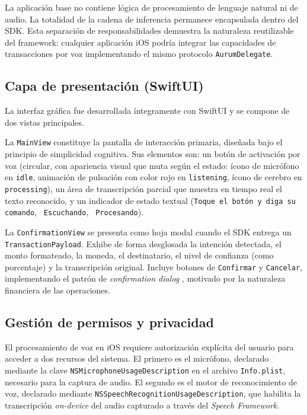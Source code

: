 La aplicación base no contiene lógica de procesamiento de lenguaje natural ni de audio. La totalidad de la cadena de inferencia permanece encapsulada dentro del SDK. Esta separación de responsabilidades demuestra la naturaleza reutilizable del framework: cualquier aplicación iOS podría integrar las capacidades de transacciones por voz implementando el mismo protocolo \texttt{Aurum\allowbreak{}Delegate}.

\subsection{Capa de presentación (SwiftUI)}

La interfaz gráfica fue desarrollada íntegramente con SwiftUI \citep{apple-swiftui} y se compone de dos vistas principales.

La \texttt{MainView} constituye la pantalla de interacción primaria, diseñada bajo el principio de simplicidad cognitiva. Sus elementos son: un botón de activación por voz (circular, con apariencia visual que muta según el estado: ícono de micrófono en \texttt{idle}, animación de pulsación con color rojo en \texttt{listening}, ícono de cerebro en \texttt{processing}), un área de transcripción parcial que muestra en tiempo real el texto reconocido, y un indicador de estado textual (\texttt{Toque el botón y diga su comando}, \texttt{ Escuchando}, \texttt{ Procesando}).

La \texttt{Confirmation\allowbreak{}View} se presenta como hoja modal cuando el SDK entrega un \texttt{Transaction\allowbreak{}Payload}. Exhibe de forma desglosada la intención detectada, el monto formateado, la moneda, el destinatario, el nivel de confianza (como porcentaje) y la transcripción original. Incluye botones de \texttt{Confirmar} y \texttt{Cancelar}, implementando el patrón de \textit{confirmation dialog} \citep{nielsen-confirmation}, motivado por la naturaleza financiera de las operaciones.

\subsection{Gestión de permisos y privacidad}
\label{subsec:permisos}

El procesamiento de voz en iOS requiere autorización explícita del usuario para acceder a dos recursos del sistema. El primero es el micrófono, declarado mediante la clave \texttt{NSMicrophone\-Usage\-Description} en el archivo \texttt{Info.plist}, necesario para la captura de audio. El segundo es el motor de reconocimiento de voz, declarado mediante \texttt{NSSpeech\-Recognition\-Usage\-Description}, que habilita la transcripción \textit{on-device} del audio capturado a través del \textit{Speech Framework}.


